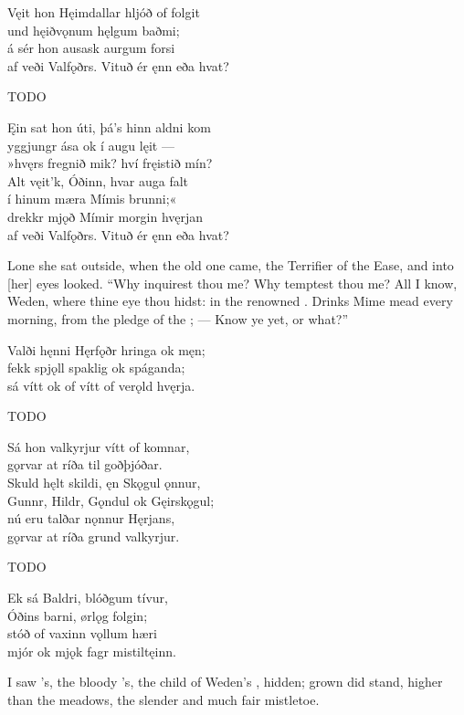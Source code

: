 \bva Vęit hon Hęimdallar \hld hljóð of folgit \\%
und hęiðvǫnum \hld hęlgum baðmi; \\%
á sér hon ausask \hld aurgum forsi \\%
af veði Valfǫðrs. \hld Vituð ér ęnn eða hvat?\eva

\bvb TODO\evb

\bva Ęin sat hon úti, \hld þá’s hinn aldni kom \\%
yggjungr ása \hld ok í augu lęit — \\%
»hvęrs fregnið mik? \hld hví fręistið mín? \\%
Alt vęit’k, Óðinn, \hld hvar auga falt \\%
í hinum mæra \hld Mímis brunni;« \\%
drekkr mjǫð Mímir \hld morgin hvęrjan \\%
af veði Valfǫðrs. \hld Vituð ér ęnn eða hvat?\eva

\bvb Lone she sat outside, when the old one came, the Terrifier of the Ease, and into [her] eyes looked. “Why inquirest thou me? Why temptest thou me? All I know, Weden, where thine eye thou hidst: in the renowned . Drinks Mime mead every morning, from the pledge of the ; — Know ye yet, or what?”\evb

\bva Valði hęnni Hęrfǫðr \hld hringa ok męn; \\%
fekk spjǫll spaklig \hld ok spáganda; \\%
sá vítt ok of vítt \hld of verǫld hvęrja.\eva

\bvb TODO\evb

\bva Sá hon valkyrjur \hld vítt of komnar, \\%
gǫrvar at ríða \hld til goðþjóðar. \\%
Skuld hęlt skildi, \hld ęn Skǫgul ǫnnur, \\%
Gunnr, Hildr, Gǫndul \hld ok Gęirskǫgul; \\%
nú eru talðar \hld nǫnnur Hęrjans, \\%
gǫrvar at ríða \hld grund valkyrjur.\eva

\bvb TODO\evb

\bva Ek sá Baldri, \hld blóðgum tívur, \\%
Óðins barni, \hld ørlǫg folgin; \\%
stóð of vaxinn \hld vǫllum hæri \\%
mjór ok mjǫk fagr \hld mistiltęinn.\eva

\bvb I saw ’s, the bloody ’s, the child of Weden’s , hidden; grown did stand, higher than the meadows, the slender and much fair mistletoe.\evb

